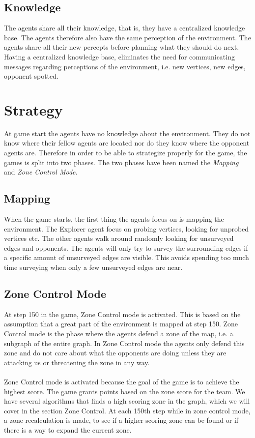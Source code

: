 \documentclass[11pt]{article}
\begin{document}
\subsection{Knowledge}
The agents share all their knowledge, that is, they have a centralized knowledge base. The agents therefore also have the same perception of the environment. The agents share all their new percepts before planning what they should do next. Having a centralized knowledge base, eliminates the need for communicating messages regarding perceptions of the environment, i.e. new vertices, new edges, opponent spotted.

\section{Strategy}
At game start the agents have no knowledge about the environment. They do not know where their fellow agents are located nor do they know where the opponent agents are. Therefore in order to be able to strategize properly for the game, the games is split into two phases. The two phases have been named the \emph{Mapping} and \emph{Zone Control Mode}.

\subsection{Mapping}
When the game starts, the first thing the agents focus on is mapping the environment. The Explorer agent focus on probing vertices, looking for unprobed vertices etc. The other agents walk around randomly looking for unsurveyed edges and opponents. The agents will only try to survey the surrounding edges if a specific amount of unsurveyed edges are visible. This avoids spending too much time surveying when only a few unsurveyed edges are near.

\subsection{Zone Control Mode}
At step 150 in the game, Zone Control mode is activated. This is based on the assumption that a great part of the environment is mapped at step 150. Zone Control mode is the phase where the agents defend a zone of the map, i.e. a subgraph of the entire graph. In Zone Control mode the agents only defend this zone and do not care about what the opponents are doing unless they are attacking us or threatening the zone in any way.\\
\\
Zone Control mode is activated because the goal of the game is to achieve the highest score. The game grants points based on the zone score for the team. We have several algorithms that finds a high scoring zone in the graph, which we will cover in the section Zone Control. At each 150th step while in zone control mode, a zone recalculation is made, to see if a higher scoring zone can be found or if there is a way to expand the current zone.
\end{document}
